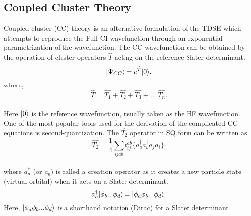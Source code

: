 \subsection{Coupled Cluster Theory} 
Coupled cluster (CC) theory\cite{Crawford00} is an alternative formulation of the TDSE which attempts to 
reproduce the Full CI wavefunction through an exponential parametrization
of the wavefunction. The CC wavefunction can be obtained by the operation of cluster
operators $\hat{T}$ acting on the reference Slater determinant. 
\\
\begin{equation}
| \Psi_{CC} \rangle = e^{\hat{T}}| 0 \rangle , 
\end{equation}
where,
\begin{equation}
 \hat{T} = \hat{T_1} + \hat{T_2} + \hat{T_3} + ... \;\hat {T_n}.
\end{equation}
\\
Here $| 0 \rangle$ is the reference wavefunction, usually taken as the HF
wavefunction. One of the most popular tools used for the derivation of the 
complicated CC equations is second-quantization\cite{JorgensenSimons81}.
The $\hat{T_2}$ operator in SQ form can be written as
\\
\begin{equation}
\hat{T_2} = \frac{1}{4}\sum_{ijab}t^{ab}_{ij}\{a^\dagger_aa^\dagger_ba_ja_i\}.
\end{equation}
\\
where ${a}^\dagger_a$ (or ${a}^\dagger_b)$ is called a creation operator as it 
creates a new particle state (virtual orbital) when it acts on a Slater determinant.
\begin{equation}
{a}^\dagger_a| \phi_b...\phi_d \rangle = | \phi_a\phi_b...\phi_d \rangle.
\end{equation}
Here, $| \phi_a\phi_b...\phi_d \rangle$ is a shorthand notation (Dirac) for a Slater determinant
